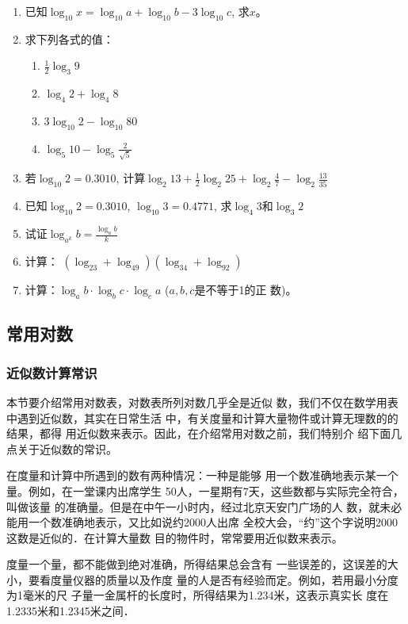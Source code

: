 \begin{enumerate}
\item 已知$\log_{10} x=\log_{10} a+\log_{10} b-3\log_{10} c$, 求$x$。
\item 求下列各式的值：
\begin{multicols}{2}
\begin{enumerate}
    \item $\frac{1}{2}\log_{3} 9$
    \item $\log_{4} 2+\log_{4} 8$
    \item $3\log_{10} 2-\log_{10} 80$
    \item $\log_{5} 10-\log_{5}\frac{2}{\sqrt{5}} $
\end{enumerate}
\end{multicols}
\item 若$\log_{10} 2=0.3010$,
计算$\log_{2} 13+\frac{1}{2}\log_{2} 25+\log_{2} \frac{4}{7}-\log_{2}\frac{13}{35} $
\item 已知$\log_{10} 2=0.3010$, $\log_{10}3=0.4771$,
求$\log_4 3$和$\log_3 2$

\item  试证$\log_{a^k}b=\frac{\log_ab}{k}$

\item 计算：
$(\log_23+\log_49)(\log_34 +\log_92)$
\item 计算：$\log_ab\cdot \log_b c\cdot \log_ca$ ($a,b,c$是不等于1的正
数)。
\end{enumerate}  

\subsection{常用对数}
\subsubsection{近似数计算常识}
本节要介绍常用对数表，对数表所列对数几乎全是近似
数，我们不仅在数学用表中遇到近似数，其实在日常生活
中，有关度量和计算大量物件或计算无理数的的结果，都得
用近似数来表示。因此，在介绍常用对数之前，我们特别介
绍下面几点关于近似数的常识。

在度量和计算中所遇到的数有两种情况：一种是能够
用一个数准确地表示某一个量。例如，在一堂课内出席学生
50人，一星期有7天，这些数都与实际完全符合，叫做该量
的准确量。但是在中午一小时内，经过北京天安门广场的人
数，就未必能用一个数准确地表示，又比如说约2000人出席
全校大会，“约”这个字说明2000这数是近似的．在计算大量数
目的物件时，常常要用近似数来表示。

度量一个量，都不能做到绝对准确，所得结果总会含有
一些误差的，这误差的大小，要看度量仪器的质量以及作度
量的人是否有经验而定。例如，若用最小分度为1毫米的尺
子量一金属杆的长度时，所得结果为1.234米，这表示真实长
度在1.2335米和1.2345米之间．

